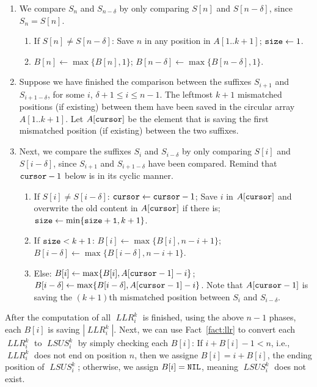 \documentclass[11pt]{llncs}
\DeclareMathOperator{\lsus}{\mathit{LSUS}}
\DeclareMathOperator{\llr}{\mathit{LLR}}
\begin{document}
\begin{enumerate}
\item We compare $S_n$ and $S_{n-\delta}$ by only comparing 
$S[n]$ and $S[n-\delta]$, since $S_n = S[n]$.
\begin{enumerate}
\item If $S[n] \neq S[n-\delta]$:
Save $n$ in any position in $A[1.. k+1]$;
${\tt size} \leftarrow 1$.

\item 
$B[n]\leftarrow \max\{B[n], 1\}$;
$B[n-\delta]\leftarrow \max\{B[n-\delta], 1\}$.

\end{enumerate} 

\item 
  Suppose we have finished the comparison between the suffixes
  $S_{i+1}$ and $S_{i+1-\delta}$, for some $i$, $\delta+1 \leq i \leq n-1$.
  The leftmost $k+1$ mismatched positions (if existing) between them
  have been saved in the circular array $A[1.. k+1]$. Let $A[{\tt cursor}]$
  be the element that 
  is saving the first mismatched position (if existing) between the two
  suffixes. 

\item  Next, we compare the suffixes $S_i$ and $S_{i-\delta}$ by
  only comparing $S[i]$ and $S[i-\delta]$, since $S_{i+1}$ and
  $S_{i+1-\delta}$ have been compared. Remind that ${\tt cursor}-1$
  below is in its cyclic manner.

  \begin{enumerate}
  \item If $S[i]\neq S[i-\delta]$: ${\tt cursor}\leftarrow {\tt
      cursor}-1$;  Save $i$
    in $A[{\tt cursor}]$ and overwrite the old content in $A[{\tt
      cursor}]$ if
    there is; ${\tt size} \leftarrow \min\{{\tt size+1}, k+1\}$.

  \item If ${\tt size} < k+1$: 
    $B[i]\leftarrow \max\{B[i], n-i+1\}$;
    $B[i-\delta]\leftarrow \max\{B[i-\delta], n-i+1\}$.
  \item Else:
    $B[i]\leftarrow \max\{B[i], A[{\tt cursor}-1]-i\}$;
    $B[i-\delta]\leftarrow \max\{B[i-\delta], A[{\tt cursor}-1]-i\}$.
    Note that $A[{\tt cursor}-1]$ is saving the $(k+1)$th
    mismatched position between $S_i$ and $S_{i-\delta}$.
\end{enumerate}

\end{enumerate}


After the computation of all $\llr_i^k$ is finished, using the above 
$n-1$ phases, each $B[i]$ is saving $|\llr_i^k|$.
Next,
we can use Fact~\ref{fact:llr} to convert each $\llr_i^k$ to
$\lsus_i^k$ by simply checking each $B[i]$: If $i+B[i]-1<n$, i.e.,
$\llr_i^k$ does not end on position $n$, then we assigne $B[i] =
i+B[i]$, the ending position of $\lsus_i^k$; otherwise, we assign
$B[i] = {\tt NIL}$, meaning $\lsus_i^k$ does not exist.
\end{document}

